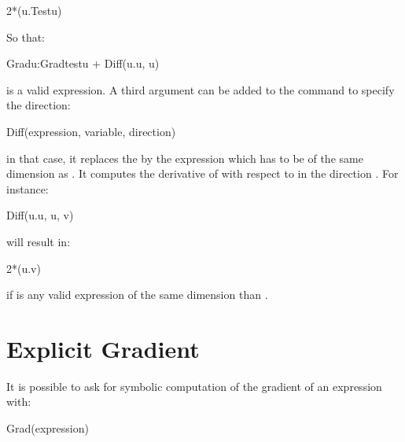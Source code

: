 \documentclass[a4paper,11pt,english]{sphinxmanual}
\begin{document}
\begin{sphinxVerbatim}[commandchars=\\\{\}]
2*(u.Test\PYGZus{}u)
\end{sphinxVerbatim}

So that:

\begin{sphinxVerbatim}[commandchars=\\\{\}]
Grad\PYGZus{}u:Grad\PYGZus{}test\PYGZus{}u + Diff(u.u, u)
\end{sphinxVerbatim}

is a valid expression. A third argument can be added to the  command to specify the direction:

\begin{sphinxVerbatim}[commandchars=\\\{\}]
Diff(expression, variable, direction)
\end{sphinxVerbatim}

in that case, it replaces the  by the expression  which has to be of the same dimension as . It computes the derivative of  with respect to  in the direction .
For instance:

\begin{sphinxVerbatim}[commandchars=\\\{\}]
Diff(u.u, u, v)
\end{sphinxVerbatim}

will result in:

\begin{sphinxVerbatim}[commandchars=\\\{\}]
2*(u.v)
\end{sphinxVerbatim}

if  is any valid expression of the same dimension than .


\section{Explicit Gradient}
\label{\detokenize{userdoc/gasm_high:explicit-gradient}}
It is possible to ask for symbolic computation of the gradient of an expression with:

\begin{sphinxVerbatim}[commandchars=\\\{\}]
Grad(expression)
\end{sphinxVerbatim}
\end{document}
